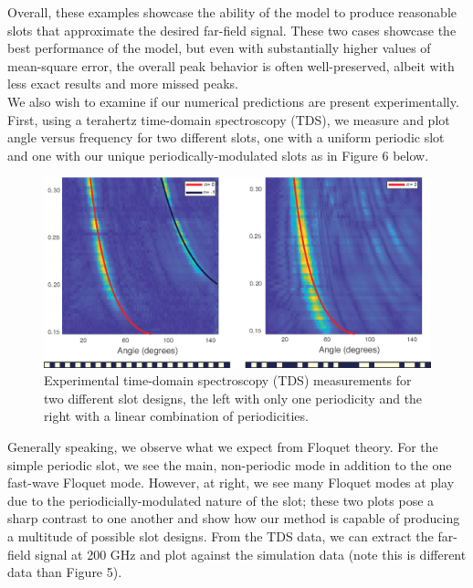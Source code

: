 \documentclass[11pt]{article}
\begin{document}
\noindent Overall, these examples showcase the ability of the model to produce reasonable slots that approximate the desired far-field signal. These two cases showcase the best performance of the model, but even with substantially higher values of mean-square error, the overall peak behavior is often well-preserved, albeit with less exact results and more missed peaks.  \\

\noindent We also wish to examine if our numerical predictions are present experimentally. First, using a terahertz time-domain spectroscopy (TDS), we measure and plot angle versus frequency for two different slots, one with a uniform periodic slot and one with our unique periodically-modulated slots as in Figure 6 below.

\begin{figure}[H]
	\centering
	\includegraphics{figures/exp-fig1.eps}
	\caption{Experimental time-domain spectroscopy (TDS) measurements for two different slot designs, the left with only one periodicity and the right with a linear combination of periodicities.}
\end{figure}

\noindent Generally speaking, we observe what we expect from Floquet theory. For the simple periodic slot, we see the main, non-periodic mode in addition to the one fast-wave Floquet mode. However, at right, we see many Floquet modes at play due to the periodicially-modulated nature of the slot; these two plots pose a sharp contrast to one another and show how our method is capable of producing a multitude of possible slot designs. From the TDS data, we can extract the far-field signal at 200 GHz and plot against the simulation data (note this is different data than Figure 5).
\end{document}
